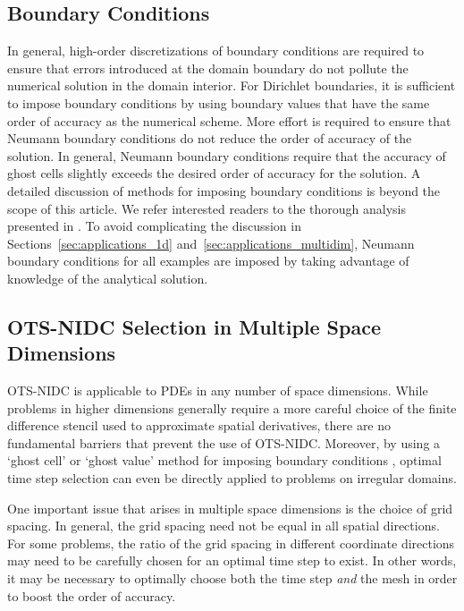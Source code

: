 \documentclass[fleqn,12pt,twoside]{article}
\begin{document}
\subsection{Boundary Conditions}
In general, high-order discretizations of boundary conditions are required 
to ensure that errors introduced at the domain boundary do not pollute 
the numerical solution in the domain interior.  For Dirichlet boundaries, 
it is sufficient to impose boundary conditions by using boundary values 
that have the same order of accuracy as the numerical scheme.  More effort is 
required to ensure that Neumann boundary conditions do not reduce the order 
of accuracy of the solution.  In general, Neumann boundary conditions require 
that the accuracy of ghost cells slightly exceeds the desired order of 
accuracy for the solution.  A detailed discussion of methods for imposing 
boundary conditions is beyond the scope of this article.  We refer interested 
readers to the thorough analysis presented in \cite{gko_book}.  To avoid 
complicating the discussion in Sections~\ref{sec:applications_1d} 
and~\ref{sec:applications_multidim}, Neumann boundary conditions for
all examples are imposed by taking advantage of knowledge of the analytical 
solution.


\subsection{\label{sec:ots_nidc_higher_spatial_dims}
            OTS-NIDC Selection in Multiple Space Dimensions}
OTS-NIDC is applicable to PDEs in any number of space dimensions.  While 
problems in higher dimensions generally require a more careful choice of the 
finite difference stencil used to approximate spatial derivatives, there are 
no fundamental barriers that prevent the use of OTS-NIDC.  Moreover, by using 
a `ghost cell' or `ghost value' method for imposing boundary 
conditions \cite{gibou_2005,ito_2005,fedkiw_1999,osher_fedkiw_book},
optimal time step selection can even be directly applied to problems on 
irregular domains.  

One important issue that arises in multiple space dimensions is the choice
of grid spacing.  In general, the grid spacing need not be equal in all 
spatial directions.  For some problems, the ratio of the grid spacing in
different coordinate directions may need to be carefully chosen for an 
optimal time step to exist.  In other words, it may be necessary to optimally 
choose both the time step \emph{and} the mesh in order to boost the order 
of accuracy.
\end{document}
